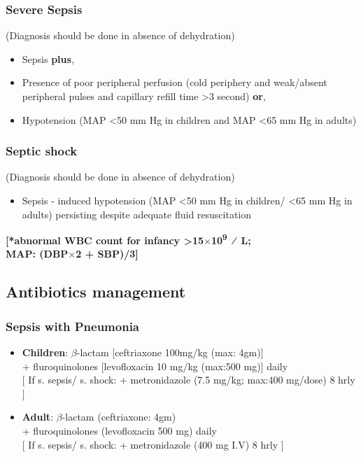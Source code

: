 \documentclass[11pt,a4paper]{report}
\begin{document}
\subsubsection{Severe Sepsis}
(Diagnosis should be done in absence of dehydration)
\begin{itemize}
	\item Sepsis \textbf{plus},
	\item Presence of poor peripheral perfusion (cold periphery and weak/absent peripheral pulses and capillary refill time \textgreater3 second) \textbf{or},
	\item Hypotension (MAP \textless50 mm Hg in children and MAP \textless65 mm Hg in adults)
\end{itemize}

\subsubsection{Septic shock}
(Diagnosis should be done in absence of dehydration) 
\begin{itemize}
	\item Sepsis - induced hypotension (MAP \textless50 mm Hg in children/ \textless65 mm Hg in adults) persisting despite adequate fluid resuscitation
\end{itemize}
\textbf{[*abnormal WBC count for infancy \textgreater15$\times$10\textsuperscript{9} ⁄ L; \\
	MAP: (DBP$\times$2 + SBP)/3]}


\subsection{Antibiotics management}
\subsubsection{Sepsis with Pneumonia}
\begin{itemize}
	\item \textbf{Children}: $\beta$-lactam [ceftriaxone 100mg/kg (max: 4gm)] \\
	+ fluroquinolones [levofloxacin 10 mg/kg (max:500 mg)] daily  \\
	$[$ If s. sepsis/ s. shock: + metronidazole (7.5 mg/kg; max:400 mg/dose) 8 hrly $]$
	\item \textbf{Adult}: $\beta$-lactam (ceftriaxone: 4gm) \\
	+ fluroquinolones (levofloxacin 500 mg) daily \\
	$[$ If s. sepsis/ s. shock: + metronidazole (400 mg I.V) 8 hrly $]$
\end{itemize}
\end{document}

